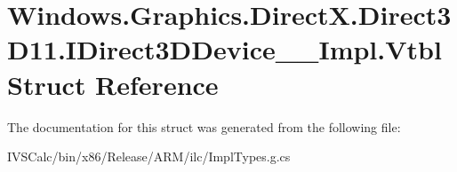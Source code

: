 \hypertarget{struct_windows_1_1_graphics_1_1_direct_x_1_1_direct3_d11_1_1_i_direct3_d_device_____impl_1_1_vtbl}{}\section{Windows.\+Graphics.\+Direct\+X.\+Direct3\+D11.\+I\+Direct3\+D\+Device\+\_\+\+\_\+\+Impl.\+Vtbl Struct Reference}
\label{struct_windows_1_1_graphics_1_1_direct_x_1_1_direct3_d11_1_1_i_direct3_d_device_____impl_1_1_vtbl}


The documentation for this struct was generated from the following file\+:\begin{DoxyCompactItemize}
\item 
I\+V\+S\+Calc/bin/x86/\+Release/\+A\+R\+M/ilc/Impl\+Types.\+g.\+cs\end{DoxyCompactItemize}
